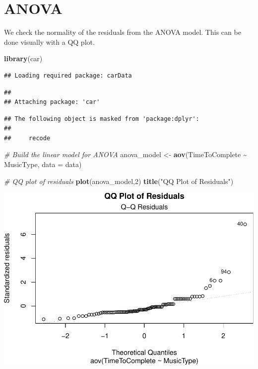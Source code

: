\documentclass[
]{article}
\newenvironment{Shaded}{\begin{snugshade}}{\end{snugshade}}
\newcommand{\AttributeTok}[1]{\textcolor[rgb]{0.13,0.29,0.53}{#1}}
\newcommand{\CommentTok}[1]{\textcolor[rgb]{0.56,0.35,0.01}{\textit{#1}}}
\newcommand{\DecValTok}[1]{\textcolor[rgb]{0.00,0.00,0.81}{#1}}
\newcommand{\FunctionTok}[1]{\textcolor[rgb]{0.13,0.29,0.53}{\textbf{#1}}}
\newcommand{\NormalTok}[1]{#1}
\newcommand{\OtherTok}[1]{\textcolor[rgb]{0.56,0.35,0.01}{#1}}
\newcommand{\SpecialCharTok}[1]{\textcolor[rgb]{0.81,0.36,0.00}{\textbf{#1}}}
\newcommand{\StringTok}[1]{\textcolor[rgb]{0.31,0.60,0.02}{#1}}
\begin{document}
\section{ANOVA}\label{anova}

We check the normality of the residuals from the ANOVA model. This can
be done visually with a QQ plot.

\begin{Shaded}
\begin{Highlighting}[]
\FunctionTok{library}\NormalTok{(car)    }
\end{Highlighting}
\end{Shaded}

\begin{verbatim}
## Loading required package: carData
\end{verbatim}

\begin{verbatim}
## 
## Attaching package: 'car'
\end{verbatim}

\begin{verbatim}
## The following object is masked from 'package:dplyr':
## 
##     recode
\end{verbatim}

\begin{Shaded}
\begin{Highlighting}[]
\CommentTok{\# Build the linear model for ANOVA}
\NormalTok{anova\_model }\OtherTok{\textless{}{-}} \FunctionTok{aov}\NormalTok{(TimeToComplete }\SpecialCharTok{\textasciitilde{}}\NormalTok{ MusicType, }\AttributeTok{data =}\NormalTok{ data)}

\CommentTok{\# QQ plot of residuals}
\FunctionTok{plot}\NormalTok{(anova\_model,}\DecValTok{2}\NormalTok{) }
\FunctionTok{title}\NormalTok{(}\StringTok{"QQ Plot of Residuals"}\NormalTok{)}
\end{Highlighting}
\end{Shaded}

\includegraphics{Assignment2_files/figure-latex/unnamed-chunk-6-1.pdf}
\end{document}
